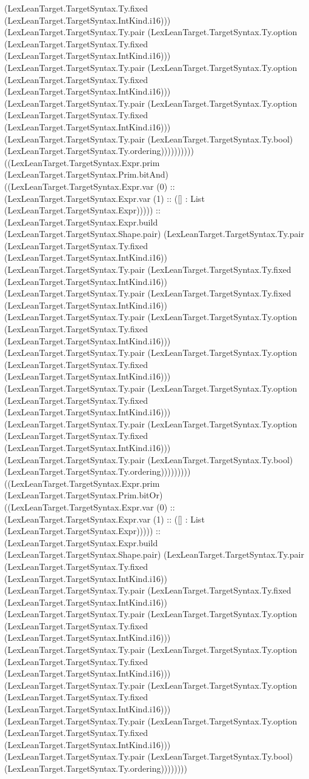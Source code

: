 \documentclass[11pt]{article}
\begin{document}
(LexLeanTarget.TargetSyntax.Ty.fixed (LexLeanTarget.TargetSyntax.IntKind.i16))) (LexLeanTarget.TargetSyntax.Ty.pair (LexLeanTarget.TargetSyntax.Ty.option (LexLeanTarget.TargetSyntax.Ty.fixed (LexLeanTarget.TargetSyntax.IntKind.i16))) (LexLeanTarget.TargetSyntax.Ty.pair (LexLeanTarget.TargetSyntax.Ty.option (LexLeanTarget.TargetSyntax.Ty.fixed (LexLeanTarget.TargetSyntax.IntKind.i16))) (LexLeanTarget.TargetSyntax.Ty.pair (LexLeanTarget.TargetSyntax.Ty.option (LexLeanTarget.TargetSyntax.Ty.fixed (LexLeanTarget.TargetSyntax.IntKind.i16))) (LexLeanTarget.TargetSyntax.Ty.pair (LexLeanTarget.TargetSyntax.Ty.bool) (LexLeanTarget.TargetSyntax.Ty.ordering)))))))))) ((LexLeanTarget.TargetSyntax.Expr.prim (LexLeanTarget.TargetSyntax.Prim.bitAnd) ((LexLeanTarget.TargetSyntax.Expr.var (0) :: (LexLeanTarget.TargetSyntax.Expr.var (1) :: ([] : List (LexLeanTarget.TargetSyntax.Expr))))) :: (LexLeanTarget.TargetSyntax.Expr.build (LexLeanTarget.TargetSyntax.Shape.pair) (LexLeanTarget.TargetSyntax.Ty.pair (LexLeanTarget.TargetSyntax.Ty.fixed (LexLeanTarget.TargetSyntax.IntKind.i16)) (LexLeanTarget.TargetSyntax.Ty.pair (LexLeanTarget.TargetSyntax.Ty.fixed (LexLeanTarget.TargetSyntax.IntKind.i16)) (LexLeanTarget.TargetSyntax.Ty.pair (LexLeanTarget.TargetSyntax.Ty.fixed (LexLeanTarget.TargetSyntax.IntKind.i16)) (LexLeanTarget.TargetSyntax.Ty.pair (LexLeanTarget.TargetSyntax.Ty.option (LexLeanTarget.TargetSyntax.Ty.fixed (LexLeanTarget.TargetSyntax.IntKind.i16))) (LexLeanTarget.TargetSyntax.Ty.pair (LexLeanTarget.TargetSyntax.Ty.option (LexLeanTarget.TargetSyntax.Ty.fixed (LexLeanTarget.TargetSyntax.IntKind.i16))) (LexLeanTarget.TargetSyntax.Ty.pair (LexLeanTarget.TargetSyntax.Ty.option (LexLeanTarget.TargetSyntax.Ty.fixed (LexLeanTarget.TargetSyntax.IntKind.i16))) (LexLeanTarget.TargetSyntax.Ty.pair (LexLeanTarget.TargetSyntax.Ty.option (LexLeanTarget.TargetSyntax.Ty.fixed (LexLeanTarget.TargetSyntax.IntKind.i16))) (LexLeanTarget.TargetSyntax.Ty.pair (LexLeanTarget.TargetSyntax.Ty.bool) (LexLeanTarget.TargetSyntax.Ty.ordering))))))))) ((LexLeanTarget.TargetSyntax.Expr.prim (LexLeanTarget.TargetSyntax.Prim.bitOr) ((LexLeanTarget.TargetSyntax.Expr.var (0) :: (LexLeanTarget.TargetSyntax.Expr.var (1) :: ([] : List (LexLeanTarget.TargetSyntax.Expr))))) :: (LexLeanTarget.TargetSyntax.Expr.build (LexLeanTarget.TargetSyntax.Shape.pair) (LexLeanTarget.TargetSyntax.Ty.pair (LexLeanTarget.TargetSyntax.Ty.fixed (LexLeanTarget.TargetSyntax.IntKind.i16)) (LexLeanTarget.TargetSyntax.Ty.pair (LexLeanTarget.TargetSyntax.Ty.fixed (LexLeanTarget.TargetSyntax.IntKind.i16)) (LexLeanTarget.TargetSyntax.Ty.pair (LexLeanTarget.TargetSyntax.Ty.option (LexLeanTarget.TargetSyntax.Ty.fixed (LexLeanTarget.TargetSyntax.IntKind.i16))) (LexLeanTarget.TargetSyntax.Ty.pair (LexLeanTarget.TargetSyntax.Ty.option (LexLeanTarget.TargetSyntax.Ty.fixed (LexLeanTarget.TargetSyntax.IntKind.i16))) (LexLeanTarget.TargetSyntax.Ty.pair (LexLeanTarget.TargetSyntax.Ty.option (LexLeanTarget.TargetSyntax.Ty.fixed (LexLeanTarget.TargetSyntax.IntKind.i16))) (LexLeanTarget.TargetSyntax.Ty.pair (LexLeanTarget.TargetSyntax.Ty.option (LexLeanTarget.TargetSyntax.Ty.fixed (LexLeanTarget.TargetSyntax.IntKind.i16))) (LexLeanTarget.TargetSyntax.Ty.pair (LexLeanTarget.TargetSyntax.Ty.bool) (LexLeanTarget.TargetSyntax.Ty.ordering)))))))) 
\end{document}
